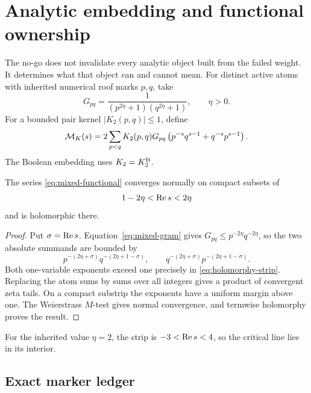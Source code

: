 \section{Analytic embedding and functional ownership}
\label{sec:mixed-functional}

The no-go does not invalidate every analytic object built from the failed
weight.  It determines what that object can and cannot mean.  For distinct
active atoms with inherited numerical roof marks \(p,q\), take
\begin{equation}
 G_{pq}=\frac{1}{(p^{2\eta}+1)(q^{2\eta}+1)},
 \qquad \eta>0.
 \label{eq:mixed-gram}
\end{equation}
For a bounded pair kernel \(|K_2(p,q)|\le1\), define
\begin{equation}
 \mathcal M_K(s)=2\sum_{p<q}K_2(p,q)G_{pq}
 \left(p^{-s}q^{s-1}+q^{-s}p^{s-1}\right).
 \label{eq:mixed-functional}
\end{equation}
The Boolean embedding uses \(K_2=K^{\mathrm B}_2\).

\begin{proposition}
\label{prop:holomorphy}
The series \eqref{eq:mixed-functional} converges normally on compact subsets
of
\begin{equation}
 1-2\eta<\operatorname{Re} s<2\eta
 \label{eq:holomorphy-strip}
\end{equation}
and is holomorphic there.
\end{proposition}
\begin{proof}
Put \(\sigma=\operatorname{Re} s\).  Equation~\eqref{eq:mixed-gram} gives
\(G_{pq}\le p^{-2\eta}q^{-2\eta}\), so the two absolute summands are bounded
by
\begin{equation}
 p^{-(2\eta+\sigma)}q^{-(2\eta+1-\sigma)},
 \qquad
 q^{-(2\eta+\sigma)}p^{-(2\eta+1-\sigma)}.
 \label{eq:product-majorant}
\end{equation}
Both one-variable exponents exceed one precisely in
\eqref{eq:holomorphy-strip}.  Replacing the atom sums by sums over all
integers gives a product of convergent zeta tails.  On a compact substrip the
exponents have a uniform margin above one.  The Weierstrass \(M\)-test gives
normal convergence, and termwise holomorphy proves the result.
\end{proof}

For the inherited value \(\eta=2\), the strip is
\(-3<\operatorname{Re} s<4\), so the critical line lies in its interior.

\subsection{Exact marker ledger}

